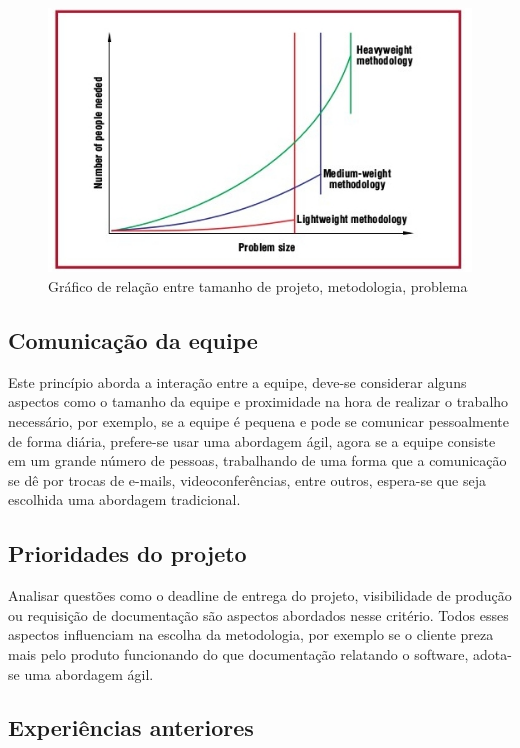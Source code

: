 \begin{figure}[!htpb]
\centering
\includegraphics[scale=0.8]{figuras/abordagem/cockburngraph}
\caption{Gráfico de relação entre tamanho de projeto, metodologia, problema}
\end{figure}

\subsection{Comunicação da equipe}

    Este princípio aborda a interação entre a equipe, deve-se considerar alguns aspectos como o tamanho da equipe e proximidade na hora de realizar o trabalho necessário, por exemplo, se a equipe é pequena e pode se comunicar pessoalmente de forma diária, prefere-se usar uma abordagem ágil, agora se a equipe consiste em um grande número de pessoas, trabalhando de uma forma que a comunicação se dê por trocas de e-mails, videoconferências, entre outros, espera-se que seja escolhida uma abordagem tradicional.

\subsection{Prioridades do projeto}
Analisar questões como o deadline de entrega do projeto, visibilidade de produção ou requisição de documentação são aspectos abordados nesse critério. Todos esses aspectos influenciam na escolha da metodologia, por exemplo se o cliente preza mais pelo produto funcionando do que documentação relatando o software, adota-se uma abordagem ágil.

\subsection{Experiências anteriores}

